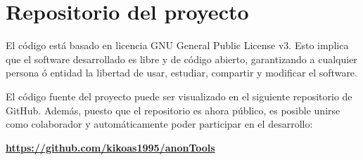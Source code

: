 \chapter{Repositorio del proyecto}
\label{Anexo:repositorio}

El código está basado en licencia GNU General Public License v3. Esto implica que el software desarrollado es libre y de código abierto, garantizando a cualquier persona ó entidad la libertad de usar, estudiar, compartir y modificar el software. 

El código fuente del proyecto puede ser visualizado en el siguiente repositorio de GitHub. Además, puesto que el repositorio es ahora público, es posible unirse como colaborador y automáticamente poder participar en el desarrollo:

\textbf{\url{https://github.com/kikoas1995/anonTools}}
\newpage \thispagestyle{empty} %